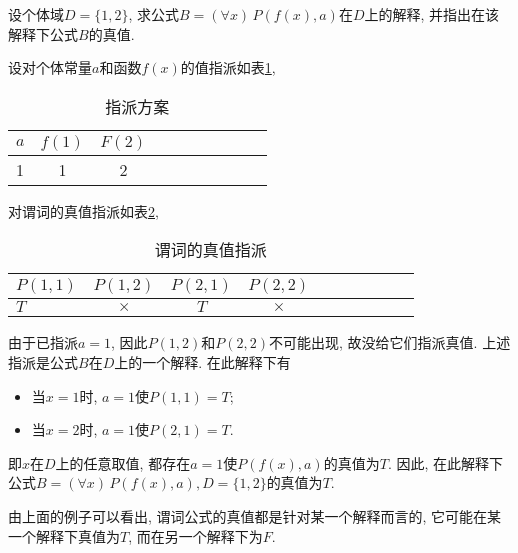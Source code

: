 \begin{example}
  设个体域$D=\{1, 2\}$, 求公式$B=(\forall x)\,P(f(x), a)$在$D$上的解释, 并指出在该解释下公式$B$的真值.
\end{example}
\begin{result}
设对个体常量$a$和函数$f(x)$的值指派如表\ref{AI_table2019113003},
\begin{table}[H]
\caption{指派方案}
\vspace{-0.6cm}
\begin{center}
\begin{tabular} {lccccccccc}
  \hline
$a$	&$f(1)$&$	F(2)$\\
\hline
1&	1	&2\\
\hline
\end{tabular}
\end{center}
\label{AI_table2019113003}
\end{table}
对谓词的真值指派如表\ref{AI_table2019113004},
\begin{table}[H]
\caption{谓词的真值指派}
\vspace{-0.6cm}
\begin{center}
\begin{tabular} {lccccccccc}
\hline
     $P(1,1)$&	  $P(1,2)$	&   $P(2,1)$&	   $P(2,2)$\\
\hline
     $T$	&   $\times$	&   $T$	&   $\times$	\\
\hline
\end{tabular}
\end{center}
\label{AI_table2019113004}
\end{table}
由于已指派$a=1$, 因此$P(1,2)$和$P(2,2)$不可能出现, 故没给它们指派真值.
上述指派是公式$B$在$D$上的一个解释. 在此解释下有
\begin{itemize}
\item 当$x=1$时, $a=1$使$P(1,1)=T$;
\item 当$x=2$时, $a=1$使$P(2,1)=T$.
\end{itemize}
即$x$在$D$上的任意取值, 都存在$a=1$使$P(f(x), a)$的真值为$T$. 因此, 在此解释下公式$B=(\forall x)\,P(f(x), a), D=\{1, 2\}$的真值为$T$.
\end{result}
\begin{remark}
    由上面的例子可以看出, 谓词公式的真值都是针对某一个解释而言的, 它可能在某一个解释下真值为$T$, 而在另一个解释下为$F$.
\end{remark}

